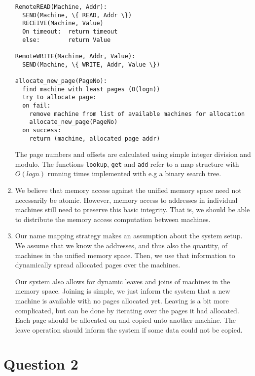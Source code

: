\documentclass[11pt]{article}
\begin{document}
\begin{enumerate}
\begin{verbatim}
RemoteREAD(Machine, Addr):
  SEND(Machine, \{ READ, Addr \})
  RECEIVE(Machine, Value)
  On timeout:  return timeout
  else:        return Value

RemoteWRITE(Machine, Addr, Value):
  SEND(Machine, \{ WRITE, Addr, Value \})

allocate_new_page(PageNo):
  find machine with least pages (O(logn))
  try to allocate page:
  on fail:
    remove machine from list of available machines for allocation
    allocate_new_page(PageNo)
  on success:
    return (machine, allocated page addr)

\end{verbatim}
    The page numbers and offsets are calculated using simple integer division and
    modulo. The functions \verb|lookup|, \verb|get| and \verb|add| refer to a map
    structure with $O(logn)$ running times implemented with e.g a binary search
    tree.

  \item
    We believe that memory access against the unified memory space need not
    necessarily be atomic. However, memory access to addresses in individual
    machines still need to preserve this basic integrity. That is, we should be able
    to distribute the memory access computation between machines.

  \item
    Our name mapping strategy makes an assumption about the system setup.
    We assume that we know the addresses, and thus also the quantity, of machines in
    the unified memory space. Then, we use that information to dynamically spread
    allocated pages over the machines.

    Our system also allows for dynamic leaves and joins of machines in the memory
    space. Joining is simple, we just inform the system that a new machine is
    available with no pages allocated yet. Leaving is a bit more complicated, but
    can be done by iterating over the pages it had allocated. Each page should be
    allocated on and copied unto another machine. The leave operation should inform
    the system if some data could not be copied.
\end{enumerate}

\section{Question 2}
\end{document}
